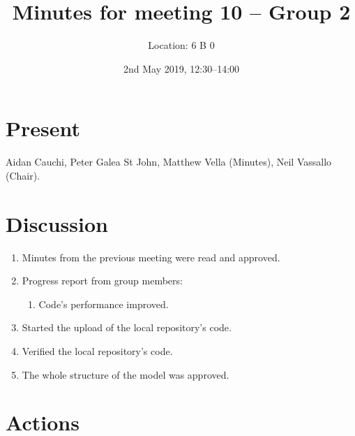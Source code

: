 \documentclass[11pt,a4paper]{article}
\title{ Minutes for meeting 10 -- Group 2}
\author{Location: 6 B 0}
\date{2nd May 2019, 12:30--14:00}
\begin{document}
\maketitle

\section*{Present}
Aidan Cauchi,
Peter Galea St John,
Matthew Vella (Minutes),
Neil Vassallo (Chair).



\section*{Discussion}

\begin{enumerate}


\item Minutes from the previous meeting were read and approved.

\item Progress report from group members:
   \begin{enumerate}
   \item Code's performance improved.
   \end{enumerate}

\item Started the upload of the local repository's code. 

\item Verified the local repository's code.  
\item The whole structure of the model was approved. 


\end{enumerate}


\section*{Actions}
\end{document}
